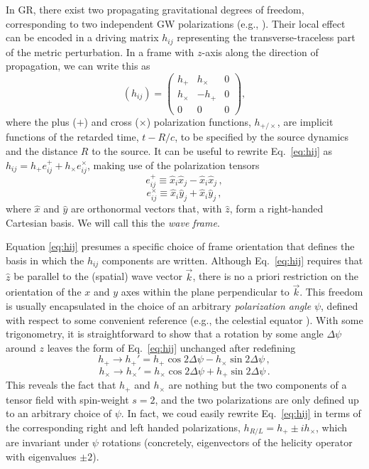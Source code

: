\documentclass[aps,prd,twocolumn,superscriptaddress,preprintnumbers,floatfix,nofootinbib]{revtex4-2}
\newcommand{\beq}{\begin{equation}}
\newcommand{\eeq}{\end{equation}}
\newcommand*{\eq}[1]{Eq.~\eqref{eq:#1}}
\begin{document}
In GR, there exist two propagating gravitational degrees of freedom, corresponding to two independent GW polarizations (e.g., \cite{Thorne:1987af}).
Their local effect can be encoded in a driving matrix $h_{ij}$ representing the transverse-traceless part of the metric perturbation.
In a frame with $z$-axis along the direction of propagation, we can write this as
\beq \label{eq:hij}
(h_{ij}) = \begin{pmatrix}
h_+ & h_\times  & 0 \\
h_\times  & - h_+ & 0  \\
0 & 0 & 0
\end{pmatrix} ,
\eeq
where the plus ($+$) and cross ($\times$) polarization functions, $h_{+/\times}$, are implicit functions of the retarded time, $t - R/c$, to be specified by the source dynamics and the distance $R$ to the source.
It can be useful to rewrite \eq{hij} as $h_{ij} = h_+ e^+_{ij} + h_\times e^\times_{ij}$, making use of the polarization tensors
\beq
e^+_{ij} \equiv \hat{x}_i \hat{x}_j - \hat{x}_i \hat{x}_j \, ,
\eeq
\beq
e^\times_{ij} \equiv \hat{x}_i \hat{y}_j + \hat{x}_i \hat{y}_j\, ,
\eeq
where $\hat{x}$ and $\hat{y}$ are orthonormal vectors that, with $\hat{z}$, form a right-handed Cartesian basis.
We will call this the \emph{wave frame}.

Equation \eqref{eq:hij} presumes a specific choice of frame orientation that defines the basis in which the $h_{ij}$ components are written.
Although \eq{hij} requires that $\hat{z}$ be parallel to the (spatial) wave vector $\vec{k}$, there is no a priori restriction on the orientation of the $x$ and $y$ axes within the plane perpendicular to $\vec{k}$.
This freedom is usually encapsulated in the choice of an arbitrary \emph{polarization angle} $\psi$, defined with respect to some convenient reference (e.g., the celestial equator \cite{LALSuite:wave}).
With some trigonometry, it is straightforward to show that a rotation by some angle $\Delta \psi$ around $z$ leaves the form of \eq{hij} unchanged after redefining
\beq \label{eq:htransf}
h_+ \rightarrow h_+' = h_+ \cos 2\Delta \psi - h_\times \sin 2\Delta\psi \, ,
\eeq
\beq
h_\times \rightarrow h_\times' = h_\times \cos 2\Delta \psi + h_+ \sin 2\Delta\psi \, .
\eeq
This reveals the fact that $h_+$ and $h_\times$ are nothing but the two components of a tensor field with spin-weight $s=2$, and the two polarizations are only defined up to an arbitrary choice of $\psi$.
In fact, we coud easily rewrite \eq{hij} in terms of the corresponding right and left handed polarizations, $h_{R/L} = h_+ \pm i h_\times$, which are invariant under $\psi$ rotations (concretely, eigenvectors of the helicity operator with eigenvalues $\pm 2$).
\end{document}
